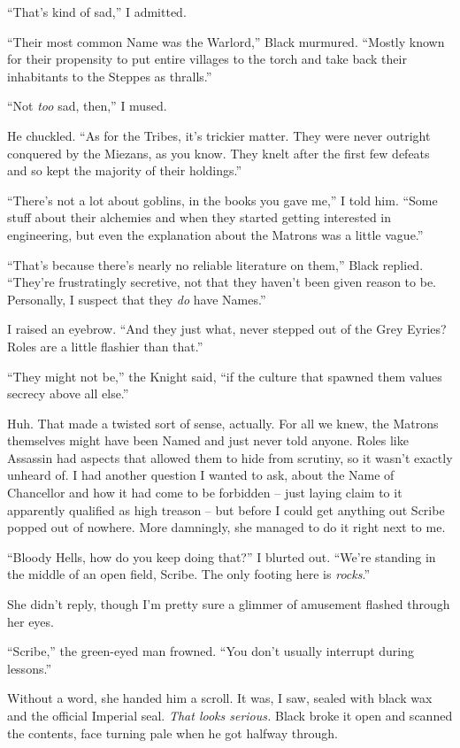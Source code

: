 \documentclass[12pt, openany]{book}
\begin{document}
“That’s kind of sad,” I admitted.

“Their most common Name was the Warlord,” Black murmured. “Mostly known for their propensity to put entire villages to the torch and take back their inhabitants to the Steppes as thralls.”

“Not \textit{too} sad, then,” I mused.

He chuckled. “As for the Tribes, it’s trickier matter. They were never outright conquered by the Miezans, as you know. They knelt after the first few defeats and so kept the majority of their holdings.”

“There’s not a lot about goblins, in the books you gave me,” I told him. “Some stuff about their alchemies and when they started getting interested in engineering, but even the explanation about the Matrons was a little vague.”

“That’s because there’s nearly no reliable literature on them,” Black replied. “They’re frustratingly secretive, not that they haven’t been given reason to be. Personally, I suspect that they \textit{do} have Names.”

I raised an eyebrow. “And they just what, never stepped out of the Grey Eyries? Roles are a little flashier than that.”

“They might not be,” the Knight said, “if the culture that spawned them values secrecy above all else.”

Huh. That made a twisted sort of sense, actually. For all we knew, the Matrons themselves might have been Named and just never told anyone. Roles like Assassin had aspects that allowed them to hide from scrutiny, so it wasn’t exactly unheard of. I had another question I wanted to ask, about the Name of Chancellor and how it had come to be forbidden – just laying claim to it apparently qualified as high treason – but before I could get anything out Scribe popped out of nowhere. More damningly, she managed to do it right next to me.

“Bloody Hells, how do you keep doing that?” I blurted out. “We’re standing in the middle of an open field, Scribe. The only footing here is \textit{rocks}.”

She didn’t reply, though I’m pretty sure a glimmer of amusement flashed through her eyes.

“Scribe,” the green-eyed man frowned. “You don’t usually interrupt during lessons.”

Without a word, she handed him a scroll. It was, I saw, sealed with black wax and the official Imperial seal. \textit{That looks serious.} Black broke it open and scanned the contents, face turning pale when he got halfway through.
\end{document}
